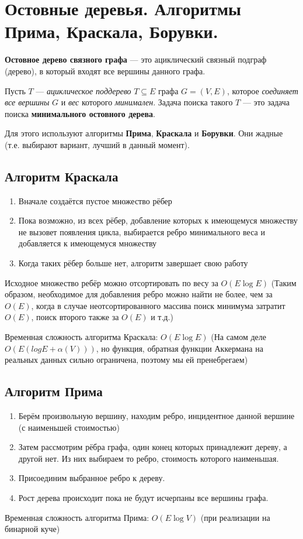\section{Остовные деревья. Алгоритмы Прима, Краскала, Борувки.}

\textbf{Остовное дерево связного графа} --- это ациклический связный подграф (дерево), в который входят все вершины данного графа.

Пусть $T$ --- \textit{ациклическое поддерево} $T\subseteq E$ графа $G=(V, E)$, которое \textit{соединяет все вершины} $G$ и \textit{вес} которого \textit{минимален}.
Задача поиска такого $T$ --- это задача поиска \textbf{минимального остовного дерева}.

Для этого используют алгоритмы \textbf{Прима}, \textbf{Краскала} и \textbf{Борувки}. Они жадные (т.е. выбирают вариант, лучший в данный момент).
\subsection{Алгоритм Краскала}
\begin{enumerate}
	\item Вначале создаётся пустое множество рёбер
	\item Пока возможно, из всех рёбер, добавление которых к имеющемуся множеству не вызовет появления цикла, выбирается ребро минимального веса и добавляется к имеющемуся множеству
	\item Когда таких рёбер больше нет, алгоритм завершает свою работу
\end{enumerate}
Исходное множество ребёр можно отсортировать по весу за $O(E\log{E})$ (Таким образом, необходимое для добавления ребро можно найти не более, чем за $O(E)$, когда в случае неотсортированного массива поиск минимума затратит $O(E)$, поиск второго также за $O(E)$ и т.д.)

Временная сложность алгоритма Краскала: $O(E\log{E})$
(На самом деле $O(E(logE+\alpha(V)))$, но функция, обратная функции Аккермана на реальных данных сильно ограничена, поэтому мы ей пренебрегаем)

\subsection{Алгоритм Прима}

\begin{enumerate}
	\item Берём произвольную вершину, находим ребро, инцидентное данной вершине (с наименьшей стоимостью)
	\item Затем рассмотрим рёбра графа, один конец которых принадлежит дереву, а другой нет. Из них выбираем то ребро, стоимость которого наименьшая.
	\item Присоединим выбранное ребро к дереву.
	\item Рост дерева происходит пока не будут исчерпаны все вершины графа.
\end{enumerate}
Временная сложность алгоритма Прима: $O(E\log{V})$ (при реализации на бинарной куче)


